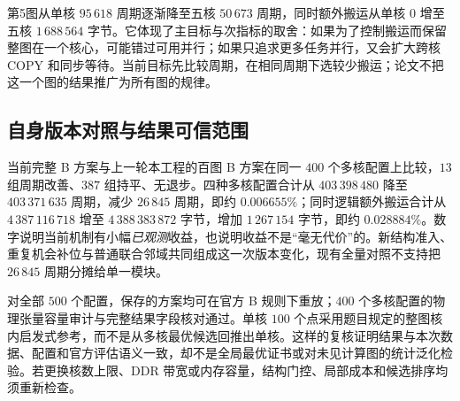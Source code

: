 第5图从单核 $95\,618$ 周期逐渐降至五核 $50\,673$ 周期，同时额外搬运从单核 $0$ 增至五核 $1\,688\,564$ 字节。它体现了主目标与次指标的取舍：如果为了控制搬运而保留整图在一个核心，可能错过可用并行；如果只追求更多任务并行，又会扩大跨核 COPY 和同步等待。当前目标先比较周期，在相同周期下选较少搬运；论文不把这一个图的结果推广为所有图的规律。

\subsection{自身版本对照与结果可信范围}
当前完整 B 方案与上一轮本工程的百图 B 方案在同一 $400$ 个多核配置上比较，$13$ 组周期改善、$387$ 组持平、无退步。四种多核配置合计从 $403\,398\,480$ 降至 $403\,371\,635$ 周期，减少 $26\,845$ 周期，即约 $0.006655\%$；同时逻辑额外搬运合计从 $4\,387\,116\,718$ 增至 $4\,388\,383\,872$ 字节，增加 $1\,267\,154$ 字节，即约 $0.028884\%$。数字说明当前机制有小幅\emph{已观测}收益，也说明收益不是“毫无代价”的。新结构准入、重复机会补位与普通联合邻域共同组成这一次版本变化，现有全量对照不支持把 $26\,845$ 周期分摊给单一模块。

对全部 $500$ 个配置，保存的方案均可在官方 B 规则下重放；$400$ 个多核配置的物理张量容量审计与完整结果字段核对通过。单核 $100$ 个点采用题目规定的整图核内启发式参考，而不是从多核最优候选回推出单核。这样的复核证明结果与本次数据、配置和官方评估语义一致，却不是全局最优证书或对未见计算图的统计泛化检验。若更换核数上限、DDR 带宽或内存容量，结构门控、局部成本和候选排序均须重新检查。
